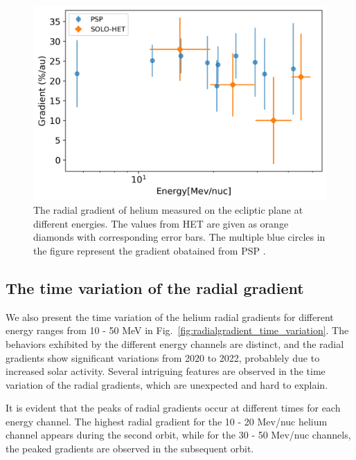 \begin{figure}[!htb]
    \centering
    \includegraphics{images/ACR/Energydependent_normal_mask20230612.png}
    \caption[Energy dependency of helium radial gradient]{The radial gradient of helium measured on the ecliptic plane at different energies. The values from \ac{HET} are given as orange diamonds with corresponding error bars. The multiple blue circles in the figure represent the gradient obatained from \ac{PSP} \citep{Rankin2021ApJ}.}
    \label{fig:comparison_SOLO_PSP}
\end{figure}



\subsection*{The time variation of the radial gradient}

We also present the time variation of the helium radial gradients for different energy ranges from 10 - 50 MeV in Fig.~\ref{fig:radialgradient_time_variation}. The behaviors exhibited by the different energy channels are distinct, and the radial gradients show significant variations from 2020 to 2022, probablely due to increased solar activity. Several intriguing features are observed in the time variation of the radial gradients, which are unexpected and hard to explain.

It is evident that the peaks of radial gradients occur at different times for each energy channel. The highest radial gradient for the 10 - 20 Mev/nuc helium channel appears during the second orbit, while for the 30 - 50 Mev/nuc channels, the peaked gradients are observed in the subsequent orbit.

